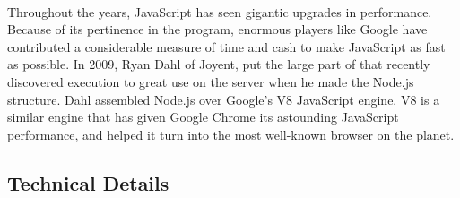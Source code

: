 \documentclass[thesis.tex]{subfiles}
\begin{document}
\paragraph{}

Throughout the years, JavaScript has seen gigantic upgrades in performance. Because of its pertinence in the program, enormous players like Google have contributed a considerable measure of time and cash to make JavaScript as fast as possible. In 2009, Ryan Dahl of Joyent, put the large part of that recently discovered execution to great use on the server when he made the Node.js structure. Dahl assembled Node.js over Google's V8 JavaScript engine. V8 is a similar engine that has given Google Chrome its astounding JavaScript performance, and helped it turn into the most well-known browser on the planet.
\newpage
\subsection{Technical Details}
\end{document}
